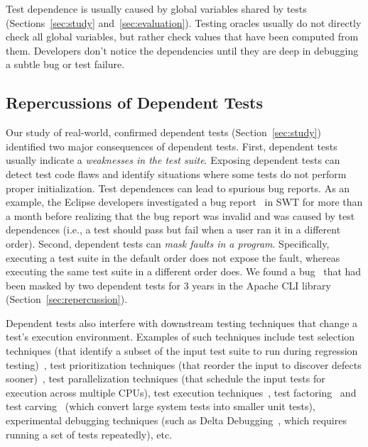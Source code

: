 Test dependence is usually caused by global variables shared by tests (Sections~\ref{sec:study}
and~\ref{sec:evaluation}).
Testing oracles usually do not directly check all global variables,
but rather check values that have been computed from
them. Developers don't notice the dependencies until they are deep in debugging a
subtle bug or test failure.


\subsection{Repercussions of Dependent Tests}


Our study of \dtnum real-world, confirmed dependent
tests 
(Section~\ref{sec:study}) identified two 
major consequences of dependent tests.
%
First, dependent tests usually indicate a
\emph{weaknesses in the test suite}. Exposing
dependent tests can detect test code flaws and identify situations
where some tests do not perform proper initialization.
Test dependences can lead
to {spurious bug reports}. As an example, the Eclipse developers
investigated a bug report~\cite{eclipsebug} in SWT for
more than a month before realizing that the 
bug report was invalid and was caused by test dependences
(i.e., a test should pass but fail when a user
ran it in a different order).
%
Second, dependent tests can
\emph{mask faults in a program}. Specifically, executing a test suite in the
default order does not expose the fault, whereas
executing the same test suite in a different order does. We found 
a bug~\cite{clibug} that had been masked by two dependent tests
for 3 years in the Apache CLI library~\cite{cli} (Section~\ref{sec:repercussion}).


Dependent tests also interfere with downstream testing
techniques that change a test's execution environment.
Examples of such techniques include
test selection techniques (that identify a subset of
the input test suite to run during
regression testing)~\cite{harroldetal:OOPSLA:2001},
test prioritization techniques (that reorder the
input to discover defects sooner)~\cite{Elbaum:2000:PTC:347324.348910},
test parallelization techniques (that schedule the input tests for execution across multiple
CPUs), test execution techniques~\cite{Misailovic:2007, SPLAT},
test factoring~\cite{Saff:2005} and test carving~\cite{Elbaum:2006} (which
convert large system tests into smaller unit tests),
experimental debugging techniques (such as Delta Debugging~\cite{Zeller:2002},
which requires running a set of tests repeatedly), etc. 

